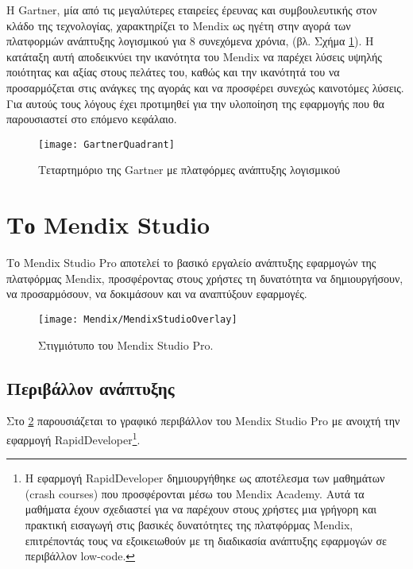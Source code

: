         Η Gartner, μία από τις μεγαλύτερες εταιρείες έρευνας και συμβουλευτικής στον κλάδο της τεχνολογίας, χαρακτηρίζει το Mendix ως ηγέτη στην αγορά των πλατφορμών ανάπτυξης λογισμικού για 8 συνεχόμενα χρόνια, (βλ. Σχήμα \ref{fig:GartnerQuadrant}). Η κατάταξη αυτή αποδεικνύει την ικανότητα του Mendix να παρέχει λύσεις υψηλής ποιότητας και αξίας στους πελάτες του, καθώς και την ικανότητά του να προσαρμόζεται στις ανάγκες της αγοράς και να προσφέρει συνεχώς καινοτόμες λύσεις. \cite{mendixGartnerQuadrant} Για αυτούς τους λόγους έχει προτιμηθεί για την υλοποίηση της εφαρμογής που θα παρουσιαστεί στο επόμενο κεφάλαιο.

            \begin{figure}[h!] \noindent \centering
                    \texttt{[image: GartnerQuadrant]}
                    \caption{\centering Τεταρτημόριο της Gartner με πλατφόρμες ανάπτυξης λογισμικού \cite{mendixGartnerQuadrant}}
                    \label{fig:GartnerQuadrant}
            \end{figure}

    \section{Το Mendix Studio}
        Το Mendix Studio Pro αποτελεί το βασικό εργαλείο ανάπτυξης εφαρμογών της πλατφόρμας Mendix, προσφέροντας στους χρήστες τη δυνατότητα να δημιουργήσουν, να προσαρμόσουν, να δοκιμάσουν και να αναπτύξουν εφαρμογές.

        \begin{figure}[h!] \noindent \centering
                \texttt{[image: Mendix/MendixStudioOverlay]}
                \caption{\centering Στιγμιότυπο του Mendix Studio Pro.}
                \label{fig:MendixStudioOverlay}
        \end{figure}

        \subsection{Περιβάλλον ανάπτυξης}
        Στο \ref{fig:MendixStudioOverlay} παρουσιάζεται το γραφικό περιβάλλον του Mendix Studio Pro με ανοιχτή την εφαρμογή RapidDeveloper\footnote{Η εφαρμογή RapidDeveloper δημιουργήθηκε ως αποτέλεσμα των μαθημάτων (crash courses) που προσφέρονται μέσω του Mendix Academy. Αυτά τα μαθήματα έχουν σχεδιαστεί για να παρέχουν στους χρήστες μια γρήγορη και πρακτική εισαγωγή στις βασικές δυνατότητες της πλατφόρμας Mendix, επιτρέποντάς τους να εξοικειωθούν με τη διαδικασία ανάπτυξης εφαρμογών σε περιβάλλον low-code.}.

